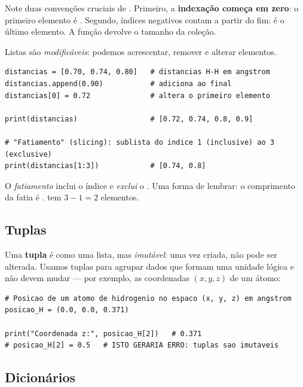 \noindent
Note duas convenções cruciais de \python{}. Primeiro, a \textbf{indexação começa em
zero}: o primeiro elemento é . Segundo, índices
negativos contam a partir do fim: \code{[-1]} é o último elemento. A função
 devolve o tamanho da coleção.

Listas são \emph{modificáveis}: podemos acrescentar, remover e alterar elementos.

\begin{lstlisting}[style=python,caption={Modificando uma lista.}]
distancias = [0.70, 0.74, 0.80]   # distancias H-H em angstrom
distancias.append(0.90)           # adiciona ao final
distancias[0] = 0.72              # altera o primeiro elemento

print(distancias)                 # [0.72, 0.74, 0.8, 0.9]

# "Fatiamento" (slicing): sublista do indice 1 (inclusive) ao 3 (exclusive)
print(distancias[1:3])            # [0.74, 0.8]
\end{lstlisting}

\begin{caixadica}
O \emph{fatiamento}  inclui o índice  e
\emph{exclui} o . Uma forma de lembrar: o comprimento da fatia é
.  tem $3-1=2$ elementos.
\end{caixadica}

\subsection{Tuplas}

Uma \textbf{tupla} é como uma lista, mas \emph{imutável}: uma vez criada, não pode
ser alterada. Usamos tuplas para agrupar dados que formam uma unidade lógica e
não devem mudar --- por exemplo, as coordenadas $(x, y, z)$ de um átomo:

\begin{lstlisting}[style=python,caption={Coordenadas atômicas como tuplas.}]
# Posicao de um atomo de hidrogenio no espaco (x, y, z) em angstrom
posicao_H = (0.0, 0.0, 0.371)

print("Coordenada z:", posicao_H[2])   # 0.371
# posicao_H[2] = 0.5   # ISTO GERARIA ERRO: tuplas sao imutaveis
\end{lstlisting}

\subsection{Dicionários}

